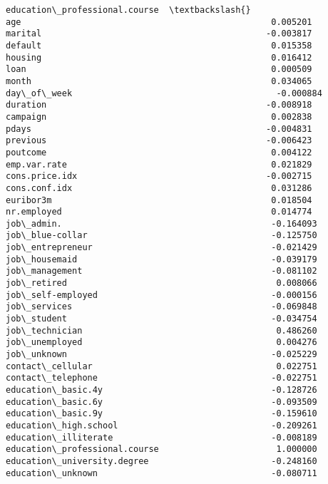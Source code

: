 \documentclass[11pt]{article}
\begin{document}
\begin{tcolorbox}[breakable, size=fbox, boxrule=.5pt, pad at break*=1mm, opacityfill=0]
\begin{Verbatim}[commandchars=\\\{\}]
                               education\_professional.course  \textbackslash{}
age                                                 0.005201
marital                                            -0.003817
default                                             0.015358
housing                                             0.016412
loan                                                0.000509
month                                               0.034065
day\_of\_week                                        -0.000884
duration                                           -0.008918
campaign                                            0.002838
pdays                                              -0.004831
previous                                           -0.006423
poutcome                                            0.004122
emp.var.rate                                        0.021829
cons.price.idx                                     -0.002715
cons.conf.idx                                       0.031286
euribor3m                                           0.018504
nr.employed                                         0.014774
job\_admin.                                         -0.164093
job\_blue-collar                                    -0.125750
job\_entrepreneur                                   -0.021429
job\_housemaid                                      -0.039179
job\_management                                     -0.081102
job\_retired                                         0.008066
job\_self-employed                                  -0.000156
job\_services                                       -0.069848
job\_student                                        -0.034754
job\_technician                                      0.486260
job\_unemployed                                      0.004276
job\_unknown                                        -0.025229
contact\_cellular                                    0.022751
contact\_telephone                                  -0.022751
education\_basic.4y                                 -0.128726
education\_basic.6y                                 -0.093509
education\_basic.9y                                 -0.159610
education\_high.school                              -0.209261
education\_illiterate                               -0.008189
education\_professional.course                       1.000000
education\_university.degree                        -0.248160
education\_unknown                                  -0.080711


\end{Verbatim}
\end{tcolorbox}
\end{document}
